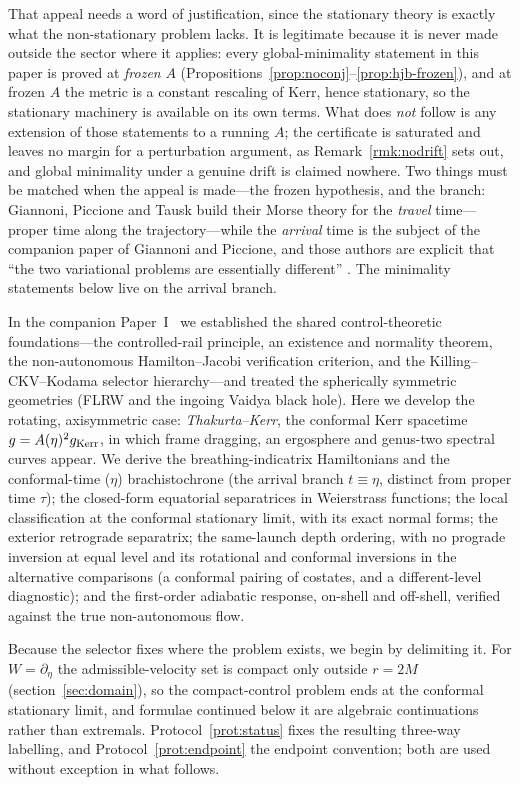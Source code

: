 \documentclass[12pt]{iopart}
\theoremstyle{plain}
\theoremstyle{definition}
\theoremstyle{remark}
\begin{document}
That appeal needs a word of justification, since the stationary theory is exactly
what the non-stationary problem lacks. It is legitimate because it is never made
outside the sector where it applies: every global-minimality statement in this paper
is proved at \emph{frozen} $A$ (Propositions~\ref{prop:noconj}--\ref{prop:hjb-frozen}),
and at frozen $A$ the metric is a constant rescaling of Kerr, hence stationary, so
the stationary machinery is available on its own terms. What does \emph{not} follow
is any extension of those statements to a running $A$; the certificate is saturated
and leaves no margin for a perturbation argument, as Remark~\ref{rmk:nodrift} sets
out, and global minimality under a genuine drift is claimed nowhere. Two things must
be matched when the appeal is made---the frozen hypothesis, and the branch: Giannoni, Piccione and Tausk build their Morse theory for the \emph{travel}
time---proper time along the trajectory---while the \emph{arrival} time is the
subject of the companion paper of Giannoni and Piccione, and those authors are
explicit that ``the two variational problems are essentially different''
\cite[\S1]{GiannoniPiccioneTausk2002}. The minimality statements below live on the
arrival branch.

In the
companion Paper~I~\cite{PaperOne} we established the shared control-theoretic
foundations---the
controlled-rail principle, an existence and normality theorem, the non-autonomous
Hamilton--Jacobi verification criterion, and the Killing--CKV--Kodama selector
hierarchy---and treated the spherically symmetric geometries (FLRW and the ingoing Vaidya
black hole). Here we develop the rotating, axisymmetric case: \emph{Thakurta--Kerr}, the
conformal Kerr spacetime $g=A(\eta)^2 g_{\rm Kerr}$, in which frame dragging, an
ergosphere and genus-two spectral curves appear. We derive the breathing-indicatrix
Hamiltonians and the conformal-time ($\eta$) brachistochrone (the arrival branch
$t\equiv\eta$, distinct from proper time $\tau$); the closed-form equatorial separatrices
in Weierstrass functions; the local classification at the conformal stationary limit, with its exact normal forms; the exterior retrograde separatrix; the same-launch depth ordering, with no prograde inversion at
equal level and its rotational and conformal inversions in the alternative comparisons
(a conformal pairing of costates, and a different-level diagnostic); and the first-order adiabatic response, on-shell and
off-shell, verified against the true non-autonomous flow.

Because the selector fixes where the problem exists, we begin by delimiting it. For
$W=\partial_\eta$ the admissible-velocity set is compact only outside $r=2M$
(section~\ref{sec:domain}), so the compact-control problem ends at the conformal
stationary limit, and formulae continued below it are algebraic continuations rather than
extremals. Protocol~\ref{prot:status} fixes the resulting three-way labelling, and
Protocol~\ref{prot:endpoint} the endpoint convention; both are used without exception in
what follows.
\end{document}
